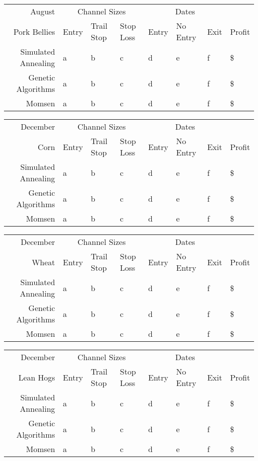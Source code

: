 \documentclass[10pt]{article}
\begin{document}
\begin{tabular}{|r|l|l|l|l|l|l|l|}
  \hline
  August & \multicolumn{3}{|c|}{Channel Sizes} & \multicolumn{3}{|c|}{Dates} &  \\
  Pork Bellies & Entry & Trail Stop & Stop Loss & Entry & No Entry & Exit & Profit\\ \hline
  Simulated Annealing & a & b & c & d & e & f & \$ \\ \hline
  Genetic Algorithms & a & b & c & d & e & f & \$ \\ \hline
  Momsen &  a & b & c & d & e & f & \$ \\ \hline
\end{tabular}

\begin{tabular}{|r|l|l|l|l|l|l|l|}
  \hline
  December & \multicolumn{3}{|c|}{Channel Sizes} & \multicolumn{3}{|c|}{Dates} &  \\
  Corn & Entry & Trail Stop & Stop Loss & Entry & No Entry & Exit & Profit\\ \hline
  Simulated Annealing & a & b & c & d & e & f & \$ \\ \hline
  Genetic Algorithms & a & b & c & d & e & f & \$ \\ \hline
  Momsen &  a & b & c & d & e & f & \$ \\ \hline
\end{tabular}

\begin{tabular}{|r|l|l|l|l|l|l|l|}
  \hline
  December & \multicolumn{3}{|c|}{Channel Sizes} & \multicolumn{3}{|c|}{Dates} &  \\
  Wheat & Entry & Trail Stop & Stop Loss & Entry & No Entry & Exit & Profit\\ \hline
  Simulated Annealing & a & b & c & d & e & f & \$ \\ \hline
  Genetic Algorithms & a & b & c & d & e & f & \$ \\ \hline
  Momsen &  a & b & c & d & e & f & \$ \\ \hline
\end{tabular}

\begin{tabular}{|r|l|l|l|l|l|l|l|}
  \hline
  December  & \multicolumn{3}{|c|}{Channel Sizes} & \multicolumn{3}{|c|}{Dates} &  \\
  Lean Hogs & Entry & Trail Stop & Stop Loss & Entry & No Entry & Exit & Profit\\ \hline
  Simulated Annealing & a & b & c & d & e & f & \$ \\ \hline
  Genetic Algorithms & a & b & c & d & e & f & \$ \\ \hline
  Momsen &  a & b & c & d & e & f & \$ \\ \hline
\end{tabular}
\end{document}
